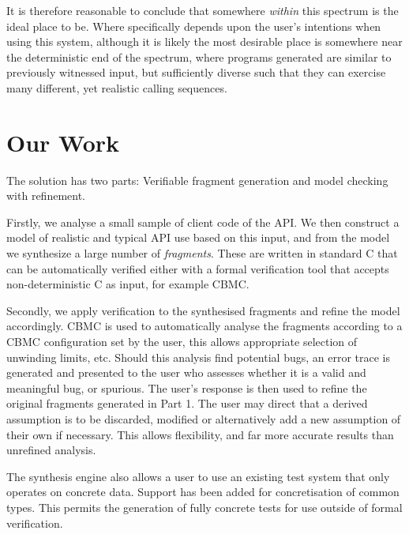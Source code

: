 \documentclass[EPiCempty]{easychair}
\begin{document}
It is therefore reasonable to conclude that somewhere \textit{within} this spectrum is the ideal place to be. Where specifically depends upon the user's intentions when using this system, although it is likely the most desirable place is somewhere near the deterministic end of the spectrum, where programs generated are similar to previously witnessed input, but sufficiently diverse such that they can exercise many different, yet realistic calling sequences.


  
  
\section{Our Work}
\label{sec:our_work}

The solution has two parts:   Verifiable fragment generation and model checking with refinement. 

Firstly, we analyse a small sample of client code of the API.  We then construct a model of realistic and typical API use based on this input, and from the model we synthesize a large number of \textit{fragments}.  These are written in standard C that can be automatically verified either with a formal verification tool that accepts non-deterministic C as input, for example CBMC. 

Secondly, we apply verification to the synthesised fragments and refine the model accordingly.  CBMC is used to automatically analyse the fragments according to a CBMC configuration set by the user, this allows appropriate selection of unwinding limits, etc.  Should this analysis find potential bugs, an error trace is generated and presented to the user who assesses whether it is a valid and meaningful bug, or spurious.  The user’s response is then used to refine the original fragments generated in Part 1.  The user may direct that a derived assumption is to be discarded, modified or alternatively add a new assumption of their own if necessary.  This allows flexibility, and far more accurate results than unrefined analysis.

The synthesis engine also allows a user to use an existing test system that only operates on concrete data.  Support has been added for concretisation of common types. This permits the generation of fully concrete tests for use outside of formal verification.
\end{document}

